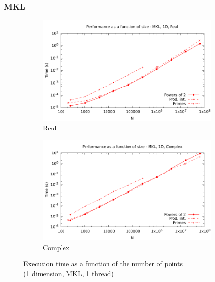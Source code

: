 \documentclass[12pt, a4paper]{article}
\begin{document}
\subsubsection{MKL}
\begin{figure}[H]
\captionsetup{width=0.8\linewidth}
\centering
\begin{subfigure}{.5\textwidth}
\centering
\includegraphics[width=.9\linewidth]{graphs/performance/1d-mkl-r.pdf}
\caption{Real}
\label{1DMKLR}
\end{subfigure}%
\begin{subfigure}{.5\textwidth}
\centering
\includegraphics[width=.9\linewidth]{graphs/performance/1d-mkl-c.pdf}
\caption{Complex}
\label{1DMKLC}
\end{subfigure}
\caption{Execution time as a function of the number of points\\(1 dimension, MKL, 1 thread)}
\label{1DMKL}
\end{figure}
\end{document}
